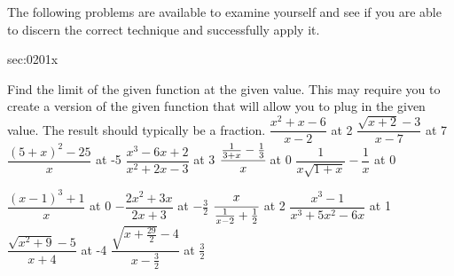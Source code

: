 \noindent%
\ExSection\label{sec:0201x}
The following problems are available to examine yourself
and see if you are able to discern the correct technique and successfully apply it.
\begin{exercises}{sec:0201x}

\begin{multicols}{2}
\prob[0201Remove1] Find the limit of the given function at the given value.
This may require you to create a version of the given function that will 
allow you to plug in the given value.  The result should typically be a fraction.
\subprob $\dfrac{x^2+x-6}{x-2}$ at 2
\subprob $\dfrac{\sqrt{x+2}-3}{x-7}$ at 7
\subprob $\dfrac{(5+x)^2-25}{x}$ at -5
\subprob $\dfrac{x^3-6x+2}{x^2+2x-3}$ at 3
\subprob $\cfrac{\frac{1}{3+x} - \frac{1}{3}}{x}$ at 0
\subprob $\dfrac{1}{x\sqrt{1+x}}-\dfrac{1}{x}$ at 0


\prob[0201Remove2] 
\subprob $\dfrac{(x-1)^3+1}{x}$ at 0
\subprob $-\dfrac{2x^2+3x}{2x+3}$ at $-\frac{3}{2}$
\subprob $\cfrac{x}{\frac{1}{x-2}+\frac{1}{2}}$ at 2
\subprob $\dfrac{x^3-1}{x^3+5x^2-6x}$ at 1
\subprob $\dfrac{\sqrt{x^2+9}-5}{x+4}$ at -4
\subprob $\dfrac{\sqrt{x+\frac{29}{2}}-4}{x-\frac{3}{2}}$ at $\frac{3}{2}$

\end{multicols}
\end{exercises}
